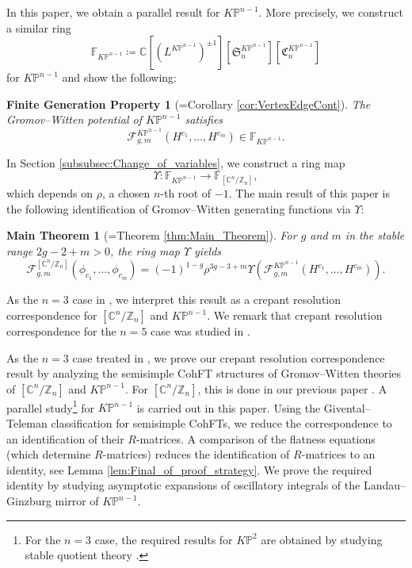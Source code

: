 \documentclass[12pt]{amsart}
\newtheorem*{thm*}{Main Theorem}
\newtheorem*{thm**}{Finite Generation Property}
\numberwithin{equation}{section}
\newcommand{\CnZn}{[\mathbb{C}^n/\mathbb{Z}_n]}
\newcommand{\KP}{K\mathbb{P}}
\begin{document}
In this paper, we obtain a parallel result for $\KP^{n-1}$. More precisely, we construct a similar ring $$\mathds{F}_{\KP^{n-1}} \coloneqq \mathbb{C}[(L^{\KP^{n-1}})^{\pm{1}}][\mathfrak{S}_n^{\KP^{n-1}}][\mathfrak{C}_n^{\KP^{n-1}}]$$ for $\KP^{n-1}$ and show the following: 
\begin{thm**}[=Corollary \ref{cor:VertexEdgeCont}]
The Gromov--Witten potential of $\KP^{n-1}$ satisfies
\begin{equation*}
 \mathcal{F}_{g, m}^{\KP^{n-1}}\left(H^{c_{1}}, \ldots, H^{c_{m}}\right)\in \mathds{F}_{\KP^{n-1}}.    
\end{equation*}
\end{thm**}

In Section \ref{subsubsec:Change_of_variables}, we construct a ring map $$\Upsilon: \mathds{F}_{\KP^{n-1}}\to  \mathds{F}_{\CnZn},$$
which depends on $\rho$, a chosen $n$-th root of $-1$. The main result of this paper is the following identification of Gromov--Witten generating functions via $\Upsilon$:

\begin{thm*}[=Theorem \ref{thm:Main_Theorem}]
For $g$ and $m$ in the stable range $2g-2+m>0$, the ring map $\Upsilon$ yields
\begin{equation*}
\mathcal{F}_{g, m}^{\CnZn}\left(\phi_{c_{1}}, \ldots, \phi_{c_{m}}\right)=(-1)^{1-g}\rho^{3g-3+m}\Upsilon \left(\mathcal{F}_{g, m}^{\KP^{n-1}}\left(H^{c_{1}}, \ldots, H^{c_{m}}\right)\right).
\end{equation*}    
\end{thm*}
As the $n=3$ case in \cite{lho-p2}, we interpret this result as a crepant resolution correspondence for $\CnZn$ and $\KP^{n-1}$. We remark that crepant resolution correspondence for the $n=5$ case was studied in \cite{lho}.

As the $n=3$ case treated in \cite{lho-p2}, we prove our crepant resolution correspondence result by analyzing the semisimple CohFT structures of Gromov--Witten theories of $\CnZn$ and $\KP^{n-1}$. For $\CnZn$, this is done in our previous paper \cite{gt}. A parallel study\footnote{For the $n=3$ case, the required results for $\KP^2$ are obtained by studying stable quotient theory \cite{lho-p}.} for $\KP^{n-1}$ is carried out in this paper. Using the Givental--Teleman classification for semisimple CohFTs, we reduce the correspondence to an identification of their $R$-matrices. A comparison of the flatness equations (which determine $R$-matrices) reduces the identification of $R$-matrices to an identity, see Lemma \ref{lem:Final_of_proof_strategy}. We prove the required identity by studying asymptotic expansions of oscillatory integrals of the Landau--Ginzburg mirror of $\KP^{n-1}$. 
\end{document}
